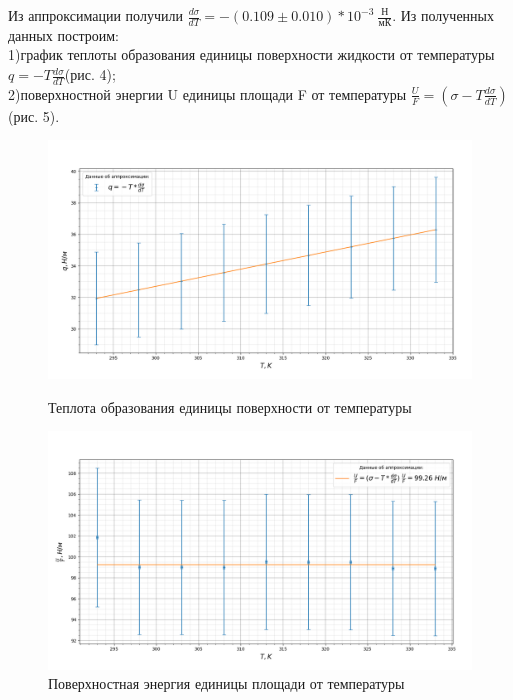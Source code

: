 \documentclass[a4paper, 12pt]{article}%
\begin{document}
	Из аппроксимации получили $\frac{d\sigma}{dT} = -(0.109\pm 0.010) * 10^{-3}~\frac{Н}{мК}$. Из полученных данных построим: \\1)график теплоты образования единицы поверхности жидкости  от температуры $q = -T\frac{d\sigma}{dT}$(рис. 4); \\2)поверхностной энергии U единицы площади F от температуры $\frac{U}{F} = (\sigma - T\frac{d\sigma}{dT})$(рис. 5).\\
	\begin{figure}[H]
		\begin{center}
			\begin{minipage}[h]{0.48\linewidth}
				\centering 
				\includegraphics[width=1\linewidth]{graph_q} 
				\caption{Теплота образования единицы поверхности от температуры}
			\end{minipage}
			\hfill
			\begin{minipage}[h]{0.48\linewidth}
				\centering 
				\includegraphics[width=1\linewidth]{graph_u} 
				\caption{Поверхностная энергия единицы площади от температуры} 
			\end{minipage}
		\end{center}
	\end{figure}
\end{document}
